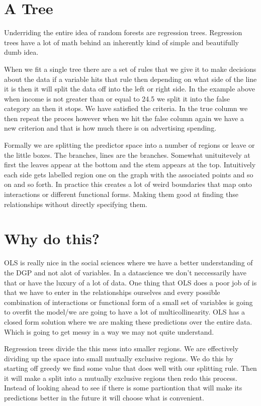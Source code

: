 \documentclass[
  letterpaper,
  DIV=11,
  numbers=noendperiod]{scrreprt}
\begin{document}
\section{A Tree}\label{a-tree}

Underriding the entire idea of random forests are regression trees.
Regression trees have a lot of math behind an inherently kind of simple
and beautifully dumb idea.

When we fit a single tree there are a set of rules that we give it to
make decisions about the data if a variable hits that rule then
depending on what side of the line it is then it will split the data off
into the left or right side. In the example above when income is not
greater than or equal to 24.5 we split it into the false category an
then it stops. We have satisfied the criteria. In the true column we
then repeat the proces however when we hit the false column again we
have a new criterion and that is how much there is on advertising
spending.

Formally we are splitting the predictor space into a number of regions
or leave or the little boxes. The branches, lines are the branches.
Somewhat unituitevely at first the leaves appear at the bottom and the
stem appears at the top. Intuitively each side gets labelled region one
on the graph with the associated points and so on and so forth. In
practice this creates a lot of weird boundaries that map onto
interactions or different functional forms. Making them good at finding
thse relationships without directly specifying them.

\section{Why do this?}\label{why-do-this}

OLS is really nice in the social sciences where we have a better
understanding of the DGP and not alot of variables. In a datascience we
don't neccessarily have that or have the luxury of a lot of data. One
thing that OLS does a poor job of is that we have to enter in the
relationships ourselves and every possible combination of interactions
or functional form of a small set of variables is going to overfit the
model/we are going to have a lot of multicollinearity. OLS has a closed
form solution where we are making these predictions over the entire
data. Which is going to get messy in a way we may not quite understand.

Regression trees divide the this mess into smaller regions. We are
effectively dividing up the space into small mutually exclusive regions.
We do this by starting off greedy we find some value that does well with
our splitting rule. Then it will make a split into a mutually exclusive
regions then redo this process. Instead of looking ahead to see if there
is some partiontion that will make its predictions better in the future
it will choose what is convenient.
\end{document}
